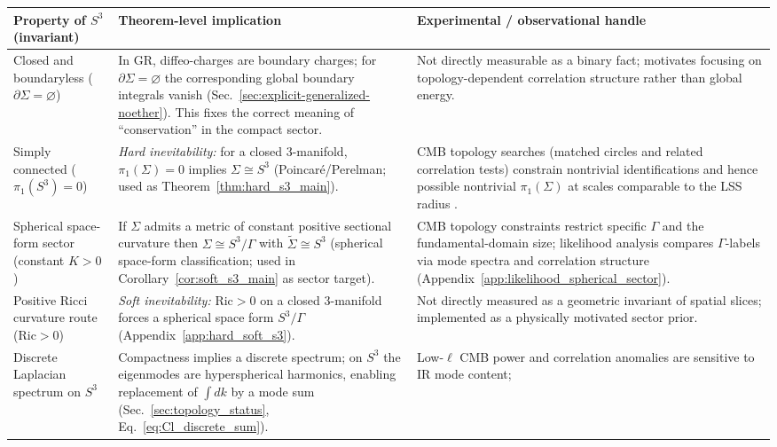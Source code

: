 \documentclass[
  reprint,
  amsmath,amssymb,
  aps,
  prd,
  superscriptaddress,
  nofootinbib,
  longbibliography
]{revtex4-2}
\newcommand{\Sthree}{S^{3}}
\newcommand{\Sig}{\Sigma}
\theoremstyle{definition}
\theoremstyle{remark}
\begin{document}
\begin{table}[t]
\centering
\renewcommand{\arraystretch}{1.15}
\begin{tabular}{p{} p{} p{}}
\hline\hline
\textbf{Property of $S^{3}$ (invariant)} & \textbf{Theorem-level implication} & \textbf{Experimental / observational handle} \\
\hline
Closed and boundaryless ($\partial\Sig=\varnothing$) & In GR, diffeo-charges are boundary charges; for
$\partial\Sig=\varnothing$ the corresponding global boundary integrals vanish (Sec.~\ref{sec:explicit-generalized-noether}).
This fixes the correct meaning of ``conservation'' in the compact sector. & Not directly measurable as a
binary fact; motivates focusing on topology-dependent correlation structure rather than global energy.
\\
\hline
Simply connected ($\pi_{1}(\Sthree)=0$) & \emph{Hard inevitability:} for a closed 3-manifold, $\pi_{1}(\Sig)=0$
implies $\Sig\cong \Sthree$ (Poincar\'e/Perelman; used as Theorem~\ref{thm:hard_s3_main}). & CMB topology
searches (matched circles and related correlation tests) constrain nontrivial identifications and hence
possible nontrivial $\pi_{1}(\Sig)$ at scales comparable to the LSS radius \cite{CornishSpergelStarkman1998,Planck2015Topology}.
\\
\hline
Spherical space-form sector (constant $K>0$) & If $\Sig$ admits a metric of constant positive sectional
curvature then $\Sig\cong \Sthree/\Gamma$ with $\widetilde\Sig\cong \Sthree$ (spherical space-form
classification; used in Corollary~\ref{cor:soft_s3_main} as sector target). & CMB topology constraints
restrict specific $\Gamma$ and the fundamental-domain size; likelihood analysis compares $\Gamma$-labels via
mode spectra and correlation structure (Appendix~\ref{app:likelihood_spherical_sector}).
\\
\hline
Positive Ricci curvature route ($\mathrm{Ric}>0$) & \emph{Soft inevitability:} $\mathrm{Ric}>0$ on a closed
3-manifold forces a spherical space form $\Sthree/\Gamma$ (Appendix~\ref{app:hard_soft_s3}). & Not directly
measured as a geometric invariant of spatial slices; implemented as a physically motivated sector prior.
\\
\hline
Discrete Laplacian spectrum on $\Sthree$ & Compactness implies a discrete spectrum; on $\Sthree$ the
eigenmodes are hyperspherical harmonics, enabling replacement of $\int dk$ by a mode sum (Sec.~\ref{sec:topology_status}, Eq.~\eqref{eq:Cl_discrete_sum}). & Low-$\ell$ CMB power and correlation anomalies are sensitive to IR mode content;

\end{tabular}
\end{table}
\end{document}
